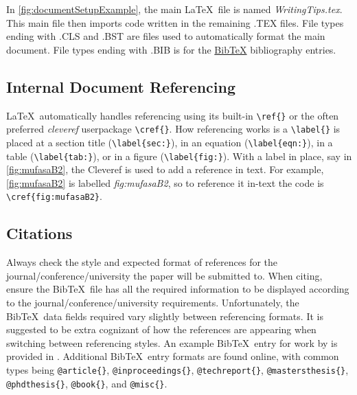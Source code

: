 \noindent
In \cref{fig:documentSetupExample}, the main \LaTeX\ file is named \textit{WritingTips.tex}. 
This main file then imports code written in the remaining .TEX files. 
File types ending with .CLS and .BST are files used to automatically format the main document. 
File types ending with .BIB is for the \href{https://www.bibtex.org/}{Bib\TeX} bibliography entries. 

\subsection{Internal Document Referencing}

\LaTeX\ automatically handles referencing using its built-in \verb*|\ref{}| or the often preferred \textit{cleveref} userpackage \verb*|\cref{}|. 
How referencing works is a \verb*|\label{}| is placed at a section title (\verb*|\label{sec:}|), in an equation (\verb*|\label{eqn:}|), in a table (\verb*|\label{tab:}|), or in a figure (\verb*|\label{fig:}|). 
With a label in place, say in \cref{fig:mufasaB2}, the Cleveref is used to add a reference in text. For example, \cref{fig:mufasaB2} is labelled \textit{fig:mufasaB2}, so to reference it in-text the code is \verb*|\cref{fig:mufasaB2}|.

\subsection{Citations}

Always check the style and expected format of references for the journal/conference/university the paper will be submitted to. 
When citing, ensure the Bib\TeX\ file has all the required information to be displayed according to the journal/conference/university requirements. 
Unfortunately, the Bib\TeX\ data fields required vary slightly between referencing formats. It is suggested to be extra cognizant  of how the references are appearing when switching between referencing styles.  
An example Bib\TeX\ entry for work by \citeauthor{BenThesis} \cite{BenThesis} is provided in . 
Additional Bib\TeX\ entry formats are found online, with common types being \verb*|@article{}|, \verb*|@inproceedings{}|, \verb*|@techreport{}|, \verb*|@mastersthesis{}|, \verb*|@phdthesis{}|, \verb*|@book{}|, and \verb*|@misc{}|. 
 

